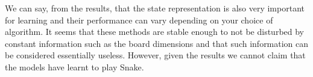 \documentclass[result.tex]{subfiles}
\begin{document}
    We can say, from the results, that the state representation is also very important for learning and their performance can vary depending on your choice of algorithm. It seems that these methods are stable enough to not be disturbed by constant information such as the board dimensions and that such information can be considered essentially useless. However, given the results we cannot claim that the models have learnt to play Snake.
\end{document}
